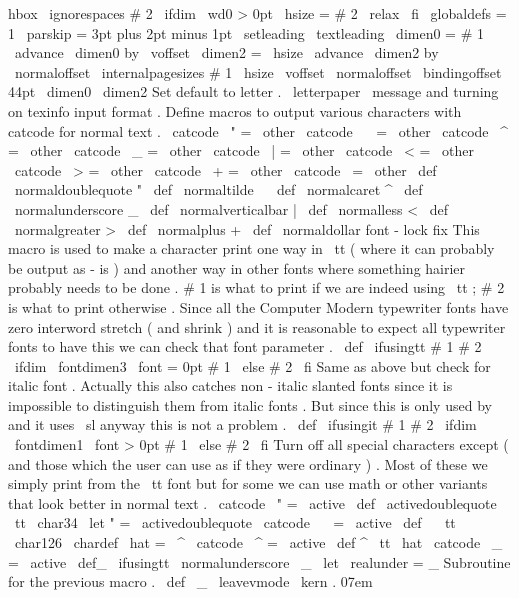 {{{hbox
{
\
ignorespaces
#
2
}
\
ifdim
\
wd0
>
0pt
\
hsize
=
#
2
\
relax
\
fi
\
globaldefs
=
1
%
\
parskip
=
3pt
plus
2pt
minus
1pt
\
setleading
{
\
textleading
}
%
%
\
dimen0
=
#
1
\
advance
\
dimen0
by
\
voffset
%
\
dimen2
=
\
hsize
\
advance
\
dimen2
by
\
normaloffset
%
\
internalpagesizes
{
#
1
}
{
\
hsize
}
%
{
\
voffset
}
{
\
normaloffset
}
%
{
\
bindingoffset
}
{
44pt
}
%
{
\
dimen0
}
{
\
dimen2
}
%
}
}
%
Set
default
to
letter
.
%
\
letterpaper
\
message
{
and
turning
on
texinfo
input
format
.
}
%
Define
macros
to
output
various
characters
with
catcode
for
normal
text
.
\
catcode
\
"
=
\
other
\
catcode
\
~
=
\
other
\
catcode
\
^
=
\
other
\
catcode
\
_
=
\
other
\
catcode
\
|
=
\
other
\
catcode
\
<
=
\
other
\
catcode
\
>
=
\
other
\
catcode
\
+
=
\
other
\
catcode
\
=
\
other
\
def
\
normaldoublequote
{
"
}
\
def
\
normaltilde
{
~
}
\
def
\
normalcaret
{
^
}
\
def
\
normalunderscore
{
_
}
\
def
\
normalverticalbar
{
|
}
\
def
\
normalless
{
<
}
\
def
\
normalgreater
{
>
}
\
def
\
normalplus
{
+
}
\
def
\
normaldollar
{
}
%
font
-
lock
fix
%
This
macro
is
used
to
make
a
character
print
one
way
in
\
tt
%
(
where
it
can
probably
be
output
as
-
is
)
and
another
way
in
other
fonts
%
where
something
hairier
probably
needs
to
be
done
.
%
%
#
1
is
what
to
print
if
we
are
indeed
using
\
tt
;
#
2
is
what
to
print
%
otherwise
.
Since
all
the
Computer
Modern
typewriter
fonts
have
zero
%
interword
stretch
(
and
shrink
)
and
it
is
reasonable
to
expect
all
%
typewriter
fonts
to
have
this
we
can
check
that
font
parameter
.
%
\
def
\
ifusingtt
#
1
#
2
{
\
ifdim
\
fontdimen3
\
font
=
0pt
#
1
\
else
#
2
\
fi
}
%
Same
as
above
but
check
for
italic
font
.
Actually
this
also
catches
%
non
-
italic
slanted
fonts
since
it
is
impossible
to
distinguish
them
from
%
italic
fonts
.
But
since
this
is
only
used
by
and
it
uses
\
sl
anyway
%
this
is
not
a
problem
.
\
def
\
ifusingit
#
1
#
2
{
\
ifdim
\
fontdimen1
\
font
>
0pt
#
1
\
else
#
2
\
fi
}
%
Turn
off
all
special
characters
except
%
(
and
those
which
the
user
can
use
as
if
they
were
ordinary
)
.
%
Most
of
these
we
simply
print
from
the
\
tt
font
but
for
some
we
can
%
use
math
or
other
variants
that
look
better
in
normal
text
.
\
catcode
\
"
=
\
active
\
def
\
activedoublequote
{
{
\
tt
\
char34
}
}
\
let
"
=
\
activedoublequote
\
catcode
\
~
=
\
active
\
def
~
{
{
\
tt
\
char126
}
}
\
chardef
\
hat
=
\
^
\
catcode
\
^
=
\
active
\
def
^
{
{
\
tt
\
hat
}
}
\
catcode
\
_
=
\
active
\
def_
{
\
ifusingtt
\
normalunderscore
\
_
}
\
let
\
realunder
=
_
%
Subroutine
for
the
previous
macro
.
\
def
\
_
{
\
leavevmode
\
kern
.
07em
}}
